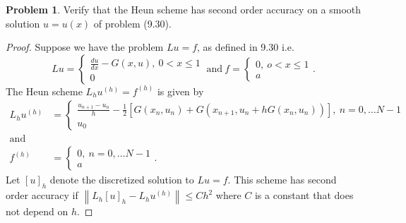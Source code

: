 \documentclass[12pt]{article}
\theoremstyle{definition}
\newtheorem{problem}{Problem}
\newcommand\norm[1]{\left\lVert#1\right\rVert}
\begin{document}
\begin{problem} Verify that the Heun scheme  has second order
  accuracy on a smooth solution $u=u(x)$ of problem (9.30).
\end{problem}

\begin{proof}
  Suppose we have the problem $Lu = f$, as defined in 9.30 i.e.
  \[
      Lu =
      \begin{cases}
        \frac{du}{dx} - G(x, u),\ 0 < x \leq 1 \\
        0
      \end{cases}
      \ \text{and} \
      f =
      \begin{cases}
        0,\ o < x \leq 1 \\
        a
      \end{cases}.
  \]
  The Heun scheme $L_hu^{(h)} = f^{(h)}$ is given by
  \begin{align*}
      L_hu^{(h)} &=
      \begin{cases}
        \frac{u_{n+1} - u_{n}}{h} - \frac{1}{2}[G(x_n, u_n) + G(x_{n+1}, u_n + h G(x_n, u_n))],\  n = 0, \dots N-1 \\
        u_0
      \end{cases}
      \\ \text{and} \\
      f^{(h)} &=
      \begin{cases}
        0,\  n = 0, \dots N-1 \\
        a
      \end{cases}.
  \end{align*}
  Let $[u]_h$ denote the discretized solution to $Lu = f$. This scheme has
  second order accuracy if $\norm{L_h[u]_h - L_hu^{(h)}} \leq C h^2$ where
  $C$ is a constant that does not depend on $h$.


\end{proof}
\end{document}
